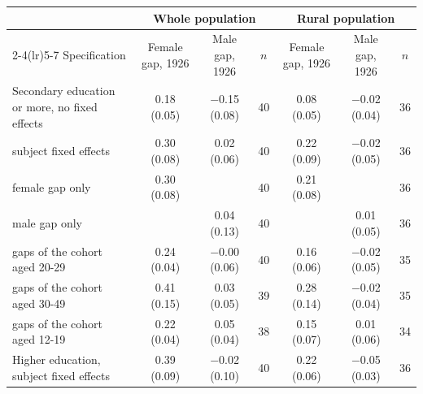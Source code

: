 \begin{tabular}{lcccccc}
\toprule
 & \multicolumn{3}{c}{Whole population} & \multicolumn{3}{c}{Rural population} \\
\cmidrule(lr){2-4}\cmidrule(lr){5-7}
Specification & Female gap, 1926 & Male gap, 1926 & $n$ & Female gap, 1926 & Male gap, 1926 & $n$ \\
\midrule
Secondary education or more, no fixed effects & 0.18 (0.05) & $-$0.15 (0.08) & 40 & 0.08 (0.05) & $-$0.02 (0.04) & 36 \\
\quad subject fixed effects & 0.30 (0.08) & 0.02 (0.06) & 40 & 0.22 (0.09) & $-$0.02 (0.05) & 36 \\
\quad female gap only & 0.30 (0.08) &  & 40 & 0.21 (0.08) &  & 36 \\
\quad male gap only &  & 0.04 (0.13) & 40 &  & 0.01 (0.05) & 36 \\
\quad 1926 gaps of the cohort aged 20-29 & 0.24 (0.04) & $-$0.00 (0.06) & 40 & 0.16 (0.06) & $-$0.02 (0.05) & 35 \\
\quad 1926 gaps of the cohort aged 30-49 & 0.41 (0.15) & 0.03 (0.05) & 39 & 0.28 (0.14) & $-$0.02 (0.04) & 35 \\
\quad 1926 gaps of the cohort aged 12-19 & 0.22 (0.04) & 0.05 (0.04) & 38 & 0.15 (0.07) & 0.01 (0.06) & 34 \\
Higher education, subject fixed effects & 0.39 (0.09) & $-$0.02 (0.10) & 40 & 0.22 (0.06) & $-$0.05 (0.03) & 36 \\
\bottomrule
\end{tabular}
